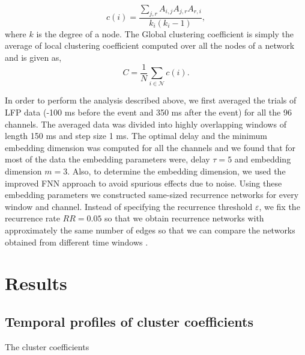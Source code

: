 \documentclass[letterpaper, 9pt, conference]{ieeeconf}
\begin{document}
\begin{equation}
c(i)=\frac{\sum_{j,r}A_{i,j}A_{j,r}A_{r,i}}{k_{i}(k_{i}-1)},
\end{equation}
where $k$ is the degree of a node. The Global clustering coefficient is simply the average of local clustering coefficient computed over all the nodes of a network and is given as,
\begin{equation}
C= \frac{1}{N}\sum_{i\in\mathcal{N}}c(i).
\end{equation}


In order to perform the analysis described above, we first averaged the trials of LFP data (-100 ms before the event and 350 ms after the event) for all the 96 channels. The averaged data was divided into highly overlapping windows of length 150 ms and step size 1 ms. The optimal delay and the minimum embedding dimension was computed for all the channels and we found that for most of the data the embedding parameters were, delay $\tau = 5$ and embedding dimension $m=3$. Also, to determine the embedding dimension, we used the improved FNN approach \cite{hegger1999improved} to avoid spurious effects due to noise. Using these embedding parameters we constructed same-sized recurrence networks for every window and channel. Instead of specifying the recurrence threshold $\varepsilon$, we fix the recurrence rate $RR = 0.05$ so that we obtain recurrence networks with approximately the same number of edges so that we can compare the networks obtained from different time windows \cite{donner2011recurrence}.


\section{Results}
\label{sec:results}

\subsection{Temporal profiles of cluster coefficients}
The cluster coefficients 
\end{document}

